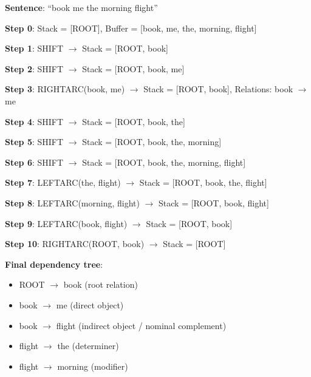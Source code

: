 \documentclass[11pt,a4paper]{article}
\begin{document}
\begin{tcolorbox}[colback=green!5!white,colframe=green!75!black,title=\textbf{Numerical: Dependency Parsing Example}]
\textbf{Sentence}: ``book me the morning flight''

\textbf{Step 0}: Stack = [ROOT], Buffer = [book, me, the, morning, flight]

\textbf{Step 1}: SHIFT $\to$ Stack = [ROOT, book]

\textbf{Step 2}: SHIFT $\to$ Stack = [ROOT, book, me]

\textbf{Step 3}: RIGHTARC(book, me) $\to$ Stack = [ROOT, book], Relations: book $\to$ me

\textbf{Step 4}: SHIFT $\to$ Stack = [ROOT, book, the]

\textbf{Step 5}: SHIFT $\to$ Stack = [ROOT, book, the, morning]

\textbf{Step 6}: SHIFT $\to$ Stack = [ROOT, book, the, morning, flight]

\textbf{Step 7}: LEFTARC(the, flight) $\to$ Stack = [ROOT, book, the, flight]

\textbf{Step 8}: LEFTARC(morning, flight) $\to$ Stack = [ROOT, book, flight]

\textbf{Step 9}: LEFTARC(book, flight) $\to$ Stack = [ROOT, book]

\textbf{Step 10}: RIGHTARC(ROOT, book) $\to$ Stack = [ROOT]

\textbf{Final dependency tree}:
\begin{itemize}
    \item ROOT $\to$ book (root relation)
    \item book $\to$ me (direct object)
    \item book $\to$ flight (indirect object / nominal complement)
    \item flight $\to$ the (determiner)
    \item flight $\to$ morning (modifier)
\end{itemize}
\end{tcolorbox}
\end{document}
